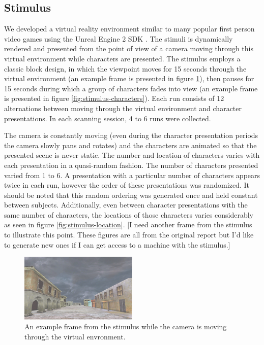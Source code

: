 \documentclass[final]{article}
\begin{document}
\subsection{Stimulus}
We developed a virtual reality environment similar to many popular first person video games using the Unreal Engine 2 SDK \cite{UnrealEngine2}.
The stimuli is dynamically rendered and presented from the point of view of a camera moving through this virtual environment while characters are presented.
The stimulus employs a classic block design, in which the viewpoint moves for 15 seconds through the virtual environment (an example frame is presented in figure \ref{fig:stimulus-movement}), then pauses for 15 seconds during which a group of characters fades into view (an example frame is presented in figure \ref{fig:stimulus-characters}).
Each run consists of 12 alternations between moving through the virtual environment and character presentations. 
In each scanning session, 4 to 6 runs were collected.

The camera is constantly moving (even during the character presentation periods the camera slowly pans and rotates) and the characters are animated so that the presented scene is never static.
The number and location of characters varies with each presentation in a quasi-random fashion.
The number of characters presented varied from 1 to 6.
A presentation with a particular number of characters appears twice in each run, however the order of these presentations was randomized.
It should be noted that this random ordering was generated once and held constant between subjects.
Additionally, even between character presentations with the same number of characters, the locations of those characters varies considerably as seen in figure \ref{fig:stimulus-location}.
[I need another frame from the stimulus to illustrate this point. These figures are all from the original report but I'd like to generate new ones if I can get access to a machine with the stimulus.]

\begin{figure}[!htbp]
\centering
\includegraphics[width=0.5\textwidth]{figures/stimulus-movement}
\caption{An example frame from the stimulus while the camera is moving through the virtual envronment.}
\label{fig:stimulus-movement}
\end{figure}
\end{document}
